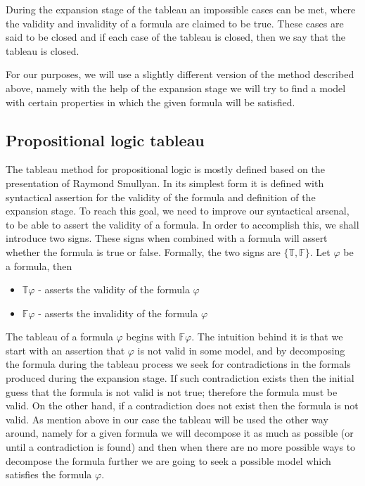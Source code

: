 \documentclass{article}
\newcommand{\signT}{\mathbb{T}}
\newcommand{\signF}{\mathbb{F}}
\begin{document}
During the expansion stage of the tableau an impossible cases can be met, where the validity and invalidity of a formula are claimed to be true. These cases are said to be closed and if each case of the tableau is closed, then we say that the tableau is closed.

For our purposes, we will use a slightly different version of the method described above, namely with the help of the expansion stage we will try to find a model with certain properties in which the given formula will be satisfied.

		\subsection{Propositional logic tableau}
The tableau method for propositional logic is mostly defined based on the presentation of Raymond Smullyan. In its simplest form it is defined with syntactical assertion for the validity of the formula and definition of the expansion stage. To reach this goal, we need to improve our syntactical arsenal, to be able to assert the validity of a formula. In order to accomplish this, we shall introduce two signs. These signs when combined with a formula will assert whether the formula is true or false. Formally, the two signs are $\{ \signT, \signF \}$. Let $\varphi$ be a formula, then
\begin{itemize}
	\item $\signT \varphi$ - asserts the validity of the formula $\varphi$
	\item $\signF \varphi$ - asserts the invalidity of the formula $\varphi$
\end{itemize} 

The tableau of a formula $\varphi$ begins with $\signF \varphi$. The intuition behind it is that we start with an assertion that $\varphi$ is not valid in some model, and by decomposing the formula during the tableau process we seek for contradictions in the formals produced during the expansion stage. If such contradiction exists then the initial guess that the formula is not valid is not true; therefore the formula must be valid. On the other hand, if a contradiction does not exist then the formula is not valid. As mention above in our case the tableau will be used the other way around, namely for a given formula we will decompose it as much as possible (or until a contradiction is found) and then when there are no more possible ways to decompose the formula further we are going to seek a possible model which satisfies the formula $\varphi$. 
\end{document}
